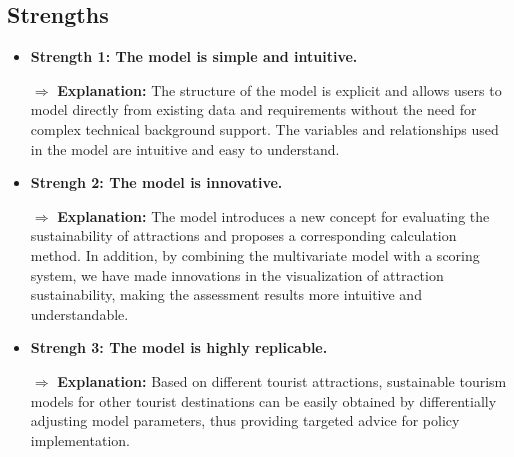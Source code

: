 \documentclass{mcmthesis}
\begin{document}
\subsection{Strengths}
\begin{itemize}
  \item \textbf{Strength 1: The model is simple and intuitive.}
  
  
  $\Rightarrow$ \textbf{Explanation:} {The structure of the model is explicit and allows users to model directly from existing data and requirements without the need for complex technical background support. The variables and relationships used in the model are intuitive and easy to understand.}
  \item \textbf{Strengh 2: The model is innovative.}
  
  $\Rightarrow$ \textbf{Explanation:} {The model introduces a new concept for evaluating the sustainability of attractions and proposes a corresponding calculation method. In addition, by combining the multivariate model with a scoring system, we have made innovations in the visualization of attraction sustainability, making the assessment results more intuitive and understandable.}
  \item \textbf{Strengh 3: The model is highly replicable.}
  
  $\Rightarrow$ \textbf{Explanation:} {Based on different tourist attractions, sustainable tourism models for other tourist destinations can be easily obtained by differentially adjusting model parameters, thus providing targeted advice for policy implementation.}
  \end{itemize}
\end{document}
